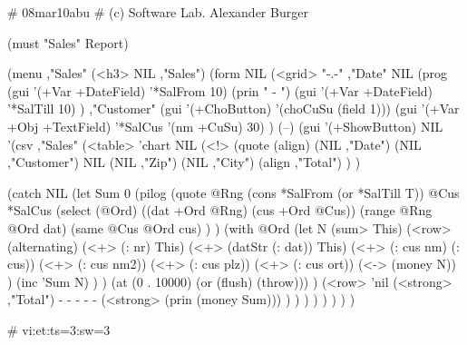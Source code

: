 \begin{wideverbatim}

# 08mar10abu
# (c) Software Lab. Alexander Burger

(must "Sales" Report)

(menu ,"Sales"
   (<h3> NIL ,"Sales")
   (form NIL
      (<grid> "-.-"
         ,"Date" NIL
         (prog
            (gui '(+Var +DateField) '*SalFrom 10)
            (prin " - ")
            (gui '(+Var +DateField) '*SalTill 10) )
         ,"Customer" (gui '(+ChoButton) '(choCuSu (field 1)))
         (gui '(+Var +Obj +TextField) '*SalCus '(nm +CuSu) 30) )
      (--)
      (gui '(+ShowButton) NIL
         '(csv ,"Sales"
            (<table> 'chart NIL
               (<!>
                  (quote
                     (align)
                     (NIL ,"Date")
                     (NIL ,"Customer")
                     NIL
                     (NIL ,"Zip")
                     (NIL ,"City")
                     (align ,"Total") ) )

\end{wideverbatim}

\begin{wideverbatim}

               (catch NIL
                  (let Sum 0
                     (pilog
                        (quote
                           @Rng (cons *SalFrom (or *SalTill T))
                           @Cus *SalCus
                           (select (@Ord)
                              ((dat +Ord @Rng) (cus +Ord @Cus))
                              (range @Rng @Ord dat)
                              (same @Cus @Ord cus) ) )
                        (with @Ord
                           (let N (sum> This)
                              (<row> (alternating)
                                 (<+> (: nr) This)
                                 (<+> (datStr (: dat)) This)
                                 (<+> (: cus nm) (: cus))
                                 (<+> (: cus nm2))
                                 (<+> (: cus plz))
                                 (<+> (: cus ort))
                                 (<-> (money N)) )
                              (inc 'Sum N) ) )
                        (at (0 . 10000) (or (flush) (throw))) )
                     (<row> 'nil
                        (<strong> ,"Total") - - - - -
                        (<strong> (prin (money Sum))) ) ) ) ) ) ) ) )

# vi:et:ts=3:sw=3


\end{wideverbatim}


